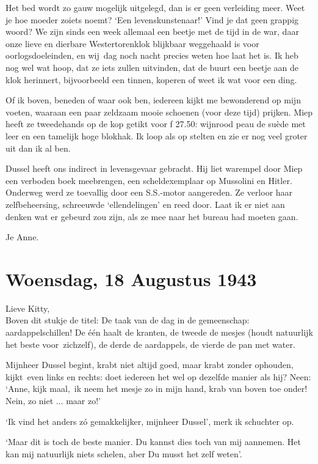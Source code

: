\documentclass{book}
\begin{document}
Het bed wordt zo gauw mogelijk uitgelegd, dan is er geen verleiding
meer. Weet je hoe moeder zoiets noemt? `Een levenskunstenaar!' Vind je
dat geen grappig woord? We zijn sinds een week allemaal een beetje met
de tijd in de war, daar onze lieve en dierbare Westertorenklok blijkbaar
weggehaald is voor oorlogsdoeleinden, en wij~dag noch nacht precies
weten hoe laat het is. Ik heb nog wel wat hoop, dat ze iets zullen
uitvinden, dat de buurt een beetje aan de klok herinnert, bijvoorbeeld
een tinnen, koperen of weet ik wat voor een ding.

Of ik boven, beneden of waar ook ben, iedereen kijkt me bewonderend op
mijn voeten, waaraan een paar zeldzaam mooie schoenen (voor deze tijd)
prijken. Miep heeft ze tweedehands op de kop getikt voor ƒ 27.50:
wijnrood peau de suède met leer en een tamelijk hoge blokhak. Ik loop
als op stelten en zie er nog veel groter uit dan ik al ben.

Dussel heeft ons indirect in levensgevaar gebracht. Hij liet warempel
door Miep een verboden boek meebrengen, een scheldexemplaar op Mussolini
en Hitler. Onderweg werd ze toevallig door een S.S.-motor aangereden. Ze
verloor haar zelfbeheersing, schreeuwde `ellendelingen' en reed door.
Laat ik er niet aan denken wat er gebeurd zou zijn, als ze mee naar het
bureau had moeten gaan.

Je Anne.

\chapter{Woensdag, 18 Augustus 1943}

Lieve Kitty,\\Boven dit stukje de titel: De taak van de dag in de
gemeenschap: aardappelschillen! De één haalt de kranten, de tweede de
mesjes (houdt natuurlijk het beste voor~zichzelf), de derde de
aardappels, de vierde de pan met water.

Mijnheer Dussel begint, krabt niet altijd goed, maar krabt zonder
ophouden, kijkt~even links en rechts: doet iedereen het wel op dezelfde
manier als hij? Neen: `Anne, kijk maal,~ik neem het mesje zo in mijn
hand, krab van boven toe onder! Nein, zo niet ... maar zo!'

`Ik vind het anders zó gemakkelijker, mijnheer Dussel', merk ik
schuchter op.

`Maar dit is toch de beste manier. Du kannst dies toch van mij aannemen.
Het kan mij natuurlijk niets schelen, aber Du musst het zelf weten'.
\end{document}
